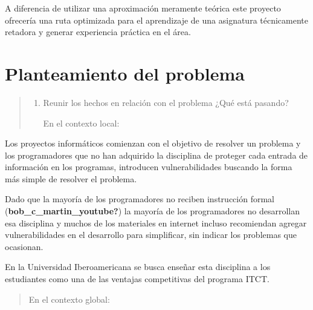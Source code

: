 \documentclass[
  12,
]{scrartcl}
\begin{document}
A diferencia de utilizar una aproximación meramente teórica este
proyecto ofrecería una ruta optimizada para el aprendizaje de una
asignatura técnicamente retadora y generar experiencia práctica en el
área.

\hypertarget{planteamiento-del-problema}{%
\section{Planteamiento del problema}\label{planteamiento-del-problema}}

\begin{quote}
\begin{enumerate}
\def\labelenumi{\arabic{enumi}.}
\item
  Reunir los hechos en relación con el problema ¿Qué está pasando?

  En el contexto local:
\end{enumerate}
\end{quote}

Los proyectos informáticos comienzan con el objetivo de resolver un
problema y los programadores que no han adquirido la disciplina de
proteger cada entrada de información en los programas, introducen
vulnerabilidades buscando la forma más simple de resolver el problema.

Dado que la mayoría de los programadores no reciben instrucción formal
(\textbf{bob\_c\_martin\_youtube?}) la mayoría de los programadores no
desarrollan esa disciplina y muchos de los materiales en internet
incluso recomiendan agregar vulnerabilidades en el desarrollo para
simplificar, sin indicar los problemas que ocasionan.

En la Universidad Iberoamericana se busca enseñar esta disciplina a los
estudiantes como una de las ventajas competitivas del programa ITCT.

\begin{quote}
En el contexto global:
\end{quote}
\end{document}
